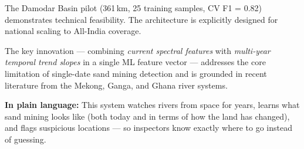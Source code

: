 \documentclass[12pt, a4paper]{article}
\begin{document}
The Damodar Basin pilot (361\,km, 25 training samples, CV F1 = 0.82)
demonstrates technical feasibility. The architecture is explicitly
designed for national scaling to All-India coverage.

The key innovation --- combining \emph{current spectral features} with
\emph{multi-year temporal trend slopes} in a single ML feature vector
--- addresses the core limitation of single-date sand mining detection
and is grounded in recent literature from the Mekong, Ganga, and Ghana
river systems.

\vspace{1cm}
\begin{tcolorbox}[colback=lightblue!20, colframe=darkblue]
  \textbf{In plain language:} This system watches rivers from space for
  years, learns what sand mining looks like (both today and in terms of
  how the land has changed), and flags suspicious locations --- so
  inspectors know exactly where to go instead of guessing.
\end{tcolorbox}
\end{document}

